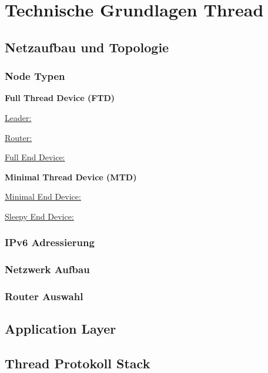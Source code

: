 \clearpage
\section{Technische Grundlagen Thread}\label{sec:TechnischeGrundlagenThread}

\subsection{Netzaufbau und Topologie}\label{subsec:NetzaufbauundTopologie}
\subsubsection{Node Typen}\label{subsubsec:NodeTypen}
\textbf{Full Thread Device (FTD)}

\underline{Leader:}

\underline{Router:}

\underline{Full End Device:}

\textbf{Minimal Thread Device (MTD)}

\underline{Minimal End Device:}

\underline{Sleepy End Device:}

\subsubsection{IPv6 Adressierung}\label{subsubsec:IPv6Adressierung}

\subsubsection{Netzwerk Aufbau}\label{subsubsec:NetzwerkAufbau}

\subsubsection{Router Auswahl}\label{subsubsec:RouterAuswahl}

\subsection{Application Layer}\label{subsec:CoAP}

\subsection{Thread Protokoll Stack}\label{subsec:ThreadProtokollStack}
